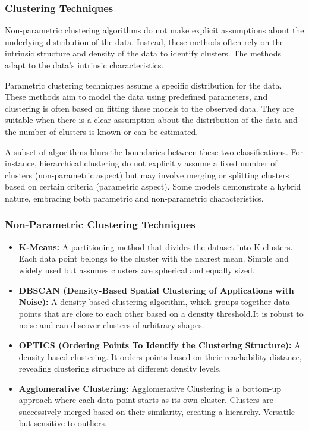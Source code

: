 \documentclass[xcolor={dvipsnames}]{beamer}
\begin{document}
\begin{frame}
\frametitle{Clustering Techniques}

Non-parametric clustering algorithms do not make explicit assumptions about the underlying distribution of the data. Instead, these methods often rely on the intrinsic structure and density of the data to identify clusters. The methods adapt to the data's intrinsic characteristics. \newline

\pause

Parametric clustering techniques assume a specific distribution for the data. These methods aim to model the data using predefined parameters, and clustering is often based on fitting these models to the observed data. They are suitable when there is a clear assumption about the distribution of the data and the number of clusters is known or can be estimated. \newline

\pause

A subset of algorithms blurs the boundaries between these two classifications. For instance, hierarchical clustering do not explicitly assume a fixed number of clusters (non-parametric aspect) but may involve merging or splitting clusters based on certain criteria (parametric aspect). Some models demonstrate a hybrid nature, embracing both parametric and non-parametric characteristics.

\end{frame}

\begin{frame}
\frametitle{Non-Parametric Clustering Techniques}

\begin{itemize}

    \item \textbf{K-Means:} A partitioning method that divides the dataset into K clusters. Each data point belongs to the cluster with the nearest mean. Simple and widely used but assumes clusters are spherical and equally sized.

    \item \textbf{DBSCAN (Density-Based Spatial Clustering of Applications with Noise):}  A density-based clustering algorithm, which groups together data points that are close to each other based on a density threshold.It is robust to noise and can discover clusters of arbitrary shapes.

    \item \textbf{OPTICS (Ordering Points To Identify the Clustering Structure):} A density-based clustering. It orders points based on their reachability distance, revealing clustering structure at different density levels.

    \item \textbf{Agglomerative Clustering:} Agglomerative Clustering is a bottom-up approach where each data point starts as its own cluster. Clusters are successively merged based on their similarity, creating a hierarchy. Versatile but sensitive to outliers.
    
\end{itemize}

\end{frame}
\end{document}
